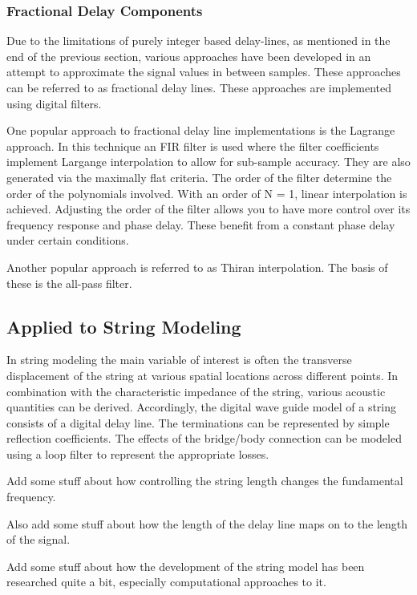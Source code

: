 \documentclass[main.tex]{subfiles}
\begin{document}
\subsubsection{Fractional Delay Components}

Due to the limitations of purely integer based delay-lines, as mentioned in the end of the previous section, various approaches have been developed in an attempt to approximate the signal values in between samples. These approaches can be referred to as fractional delay lines. These approaches are implemented using digital filters.

One popular approach to fractional delay line implementations is the Lagrange approach. In this technique an FIR filter is used where the filter coefficients implement Largange interpolation to allow for sub-sample accuracy. They are also generated via the maximally flat criteria. The order of the filter determine the order of the polynomials involved. With an order of N = 1, linear interpolation is achieved. Adjusting the order of the filter allows you to have more control over its frequency response and phase delay. These benefit from a constant phase delay under certain conditions.

Another popular approach is referred to as Thiran interpolation. The basis of these is the all-pass filter.

\subsection{Applied to String Modeling}

In string modeling the main variable of interest is often the transverse displacement of the string at various spatial locations across different points. In combination with the characteristic impedance of the string, various acoustic quantities can be derived. Accordingly, the digital wave guide model of a string consists of a digital delay line. The terminations can be represented by simple reflection coefficients. The effects of the bridge/body connection can be modeled using a loop filter to represent the appropriate losses.

Add some stuff about how controlling the string length changes the fundamental frequency.

Also add some stuff about how the length of the delay line maps on to the length of the signal.

Add some stuff about how the development of the string model has been researched quite a bit, especially computational approaches to it.
\end{document}
